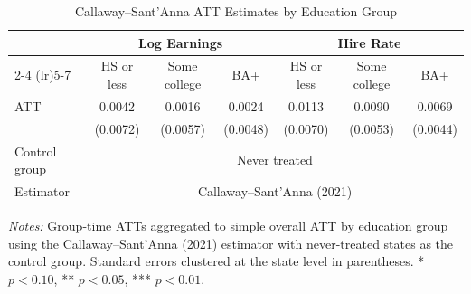 
\begin{table}[H]
\centering
\caption{Callaway--Sant'Anna ATT Estimates by Education Group}
\label{tab:cs_edu}
\begin{threeparttable}
\small
\begin{tabular}{lcccccc}
\toprule
& \multicolumn{3}{c}{Log Earnings} & \multicolumn{3}{c}{Hire Rate} \\
\cmidrule(lr){2-4} \cmidrule(lr){5-7}
& HS or less & Some college & BA+ & HS or less & Some college & BA+ \\
\midrule
ATT & 0.0042 & 0.0016 & 0.0024 & 0.0113 & 0.0090 & 0.0069 \\
& (0.0072) & (0.0057) & (0.0048) & (0.0070) & (0.0053) & (0.0044) \\
\midrule
Control group & \multicolumn{6}{c}{Never treated} \\
Estimator & \multicolumn{6}{c}{Callaway--Sant'Anna (2021)} \\
\bottomrule
\end{tabular}
\begin{tablenotes}[flushleft]
\footnotesize
\item \textit{Notes:} Group-time ATTs aggregated to simple overall ATT by education group using the Callaway--Sant'Anna (2021) estimator with never-treated states as the control group. Standard errors clustered at the state level in parentheses. * $p<0.10$, ** $p<0.05$, *** $p<0.01$.
\end{tablenotes}
\end{threeparttable}
\end{table}

